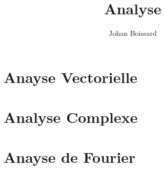 
\title{Analyse}
\date{}
\author {Johan Boissard}

	
	\part{Anayse Vectorielle}
		
		
		
		
		
		
		
	\part{Analyse Complexe}
		
		
		
		
		
	\part{Anayse de Fourier}
	\printindex

